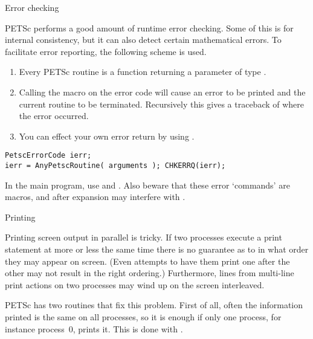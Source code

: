 
 {Error checking}

PETSc performs a good amount of runtime error checking. Some of this
is for internal consistency, but it can also detect certain
mathematical errors. To facilitate error reporting, the following
scheme is used.
\begin{enumerate}
\item Every PETSc routine is a function returning a parameter of type
  .
\item Calling the macro  on the error code will
  cause an error to be printed and the current routine to be
  terminated. Recursively this gives a traceback of where the error
  occurred.
\item You can effect your own error return by using .
\end{enumerate}
\begin{lstlisting}
PetscErrorCode ierr;
ierr = AnyPetscRoutine( arguments ); CHKERRQ(ierr);
\end{lstlisting}
\begin{fortrannote}
  In the main program, use  and
  . Also beware that these error `commands' are
  macros, and after expansion may interfere with
  .
\end{fortrannote}

 {Printing}

Printing screen output in parallel is tricky. If two processes execute
a print statement at more or less the same time there is no guarantee
as to in what order they may appear on screen. (Even attempts to have
them print one after the other may not result in the right ordering.)
Furthermore, lines from multi-line print actions on two processes may
wind up on the screen interleaved.

PETSc has two routines that fix this problem. First of all, often the
information printed is the same on all processes, so it is enough if
only one process, for instance process~0, prints it. This is done with
.


